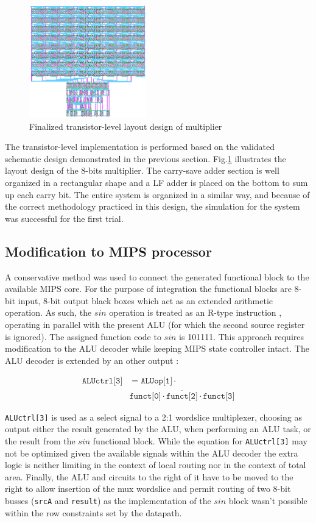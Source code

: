 \documentclass[10pt,journal]{IEEEtran}
\begin{document}
\begin{figure}[h]
\centering
\includegraphics[width=2in]{finalized_transistor_design.png}
\caption{Finalized transistor-level layout design of multiplier}
\label{finalized_transistor_design}
\end{figure}

The transistor-level implementation is performed based on the validated schematic design demonstrated in the previous section. Fig.\ref{finalized_transistor_design} illustrates the layout design of the 8-bits multiplier. The carry-save adder section is well organized in a rectangular shape and a LF adder is placed on the bottom to sum up each carry bit. The entire system is organized in a similar way, and because of the correct methodology practiced in this design, the simulation for the system was successful for the first trial.

\subsection{Modification to MIPS processor}
A conservative method was used to connect the generated functional block to the available MIPS core. For the purpose of integration the functional blocks are 8-bit input, 8-bit output black boxes which act as an extended arithmetic operation. As such, the $sin$ operation  is treated as an R-type instruction , operating in parallel with the present ALU (for which the second source register is ignored). The assigned function code to $sin$ is 101111. This approach requires modification to the ALU decoder while keeping MIPS state controller intact. The ALU decoder is extended by an other output :

\begin{align*}
	\texttt{ALUctrl[3]} &=  \texttt{ALUop[1]} \cdot \\
	& \overline{\texttt{funct[0]} \cdot \texttt{funct[2]} \cdot \texttt{funct[3]}}
\end{align*}

\texttt{ALUctrl[3]} is used as a select signal to a 2:1 wordslice multiplexer, choosing as output either the result generated by the ALU, when performing an ALU task, or the result from the $sin$ functional block. While the equation for \texttt{ALUctrl[3]} may not be optimized given the available signals within the ALU decoder the extra logic is neither limiting in the context of local routing nor in the context of total area. Finally, the ALU and circuits to the right of it have to be moved to the right to allow insertion of the mux wordslice and permit routing of two 8-bit busses (\texttt{srcA} and \texttt{result}) as the implementation of the $sin$ block wasn't possible within the row constraints set by the datapath.
\end{document}
